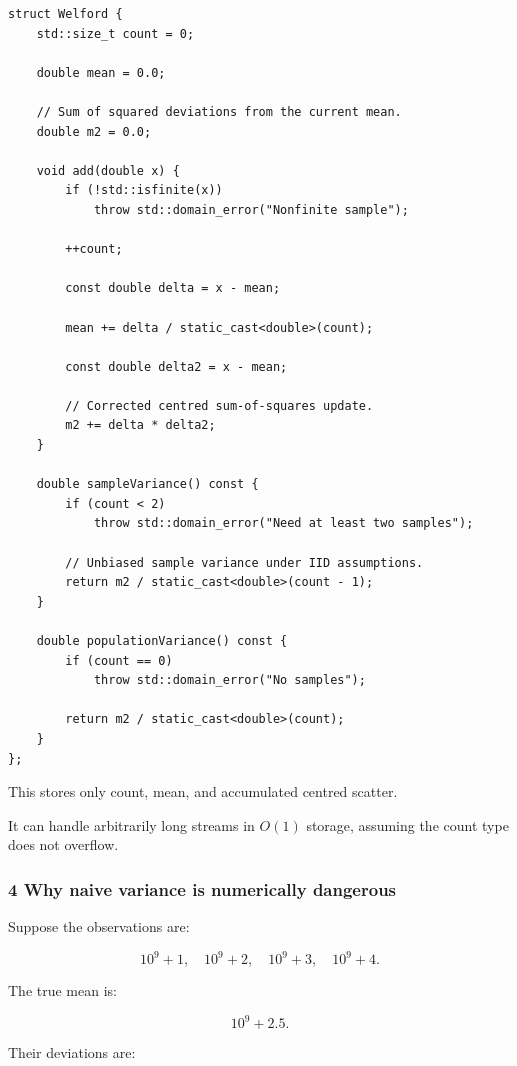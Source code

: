 \begin{verbatim}
struct Welford {
    std::size_t count = 0;

    double mean = 0.0;

    // Sum of squared deviations from the current mean.
    double m2 = 0.0;

    void add(double x) {
        if (!std::isfinite(x))
            throw std::domain_error("Nonfinite sample");

        ++count;

        const double delta = x - mean;

        mean += delta / static_cast<double>(count);

        const double delta2 = x - mean;

        // Corrected centred sum-of-squares update.
        m2 += delta * delta2;
    }

    double sampleVariance() const {
        if (count < 2)
            throw std::domain_error("Need at least two samples");

        // Unbiased sample variance under IID assumptions.
        return m2 / static_cast<double>(count - 1);
    }

    double populationVariance() const {
        if (count == 0)
            throw std::domain_error("No samples");

        return m2 / static_cast<double>(count);
    }
};
\end{verbatim}

This stores only count, mean, and accumulated centred scatter.

It can handle arbitrarily long streams in \(O(1)\) storage, assuming the count type does not overflow.

\subsubsection{4 Why naive variance is numerically dangerous}\label{02-foundations-ii-ch030-why-naive-variance-is-numerically-dangerous}

\hypertarget{02-foundations-ii-ch030-why-naive-variance-is-numerically-dangerous}{}

Suppose the observations are:

\[
 10^9+1,\quad10^9+2,\quad10^9+3,\quad10^9+4.
\]

The true mean is:

\[
 10^9+2.5.
\]

Their deviations are:

